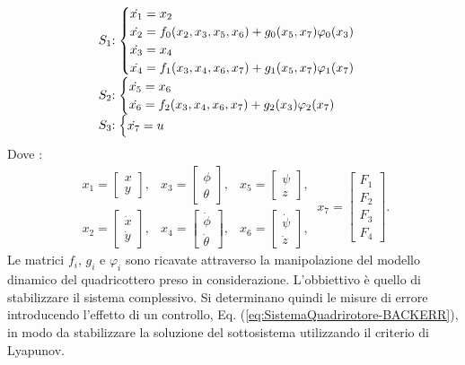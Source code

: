 \begin{equation}\label{eq:SistemaQuadrirotore_BACKSis}
\begin{array}{r@{}l}
	S_1 &:
	\begin{cases}
	\dot{x_1} = x_2 \\ \dot{x_2} = f_0(x_2,x_3,x_5,x_6) + g_0(x_5,x_7)\varphi_0(x_3) \\ \dot{x_3}=x_4 \\ \dot{x_4} = f_1(x_3,x_4,x_6,x_7) + g_1(x_5,x_7)\varphi_1(x_7)
	\end{cases} \\ 
		S_2 &:
	\begin{cases}
	\dot{x_5} = x_6 \\ \dot{x_6} = f_2(x_3,x_4,x_6,x_7) + g_2(x_3) \varphi_2(x_7)
	\end{cases} \\
		S_3 &:
	\begin{cases}
	\dot{x_7}=u
	\end{cases}
\end{array}
\end{equation}
Dove :
\[
\begin{matrix}
x_1 = \begin{bmatrix}
x \\ y
\end{bmatrix}, &
x_3 = \begin{bmatrix}
\phi \\ \theta
\end{bmatrix}, &
x_5 = \begin{bmatrix}
\psi \\ z
\end{bmatrix}, \\
x_2 = \begin{bmatrix}
\dot{x} \\ \dot{y}
\end{bmatrix}, &
x_4 = \begin{bmatrix}
\dot{\phi} \\ \dot{\theta}
\end{bmatrix}, &
x_6 = \begin{bmatrix}
\dot{\psi} \\ \dot{z}
\end{bmatrix},
\end{matrix} \ 
x_7 = \begin{bmatrix}
F_1 \\ F_2 \\ F_3 \\ F_4
\end{bmatrix}.
\]
Le matrici $f_i$, $g_i$ e $\varphi_i$ sono ricavate attraverso la manipolazione del modello dinamico del quadricottero preso in considerazione.
L'obbiettivo è quello di stabilizzare il sistema complessivo. Si determinano quindi le misure di errore introducendo l'effetto di un controllo, Eq. (\ref{eq:SistemaQuadrirotore-BACKERR}), in modo da stabilizzare la soluzione del sottosistema utilizzando il criterio di Lyapunov. 

